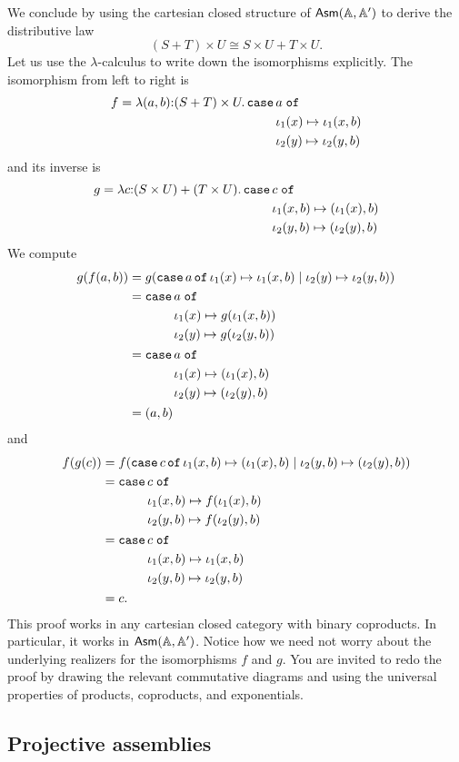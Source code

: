 We conclude by using the cartesian closed structure of $\mathsf{Asm}(\mathbb{A},\mathbb{A}')$ to
derive the distributive law
%
\begin{equation*}
  (S + T) \times U \cong
  S \times U + T \times U.
\end{equation*}
%
Let us use the $\lambda$-calculus to write down the isomorphisms
explicitly. The isomorphism from left to right is
%
\begin{equation*}
  f = \lam{(a,b) \of (S + T) \times U}{
    \xcase{a}
    {\iota_1(x)}{\iota_1(x, b)}
    {\iota_2(y)}{\iota_2(y, b)}
  }
\end{equation*}
%
and its inverse is
%
\begin{equation*}
  g = \lam{c \of (S \times U) + (T \times U)}{
    \xcase{c}
    {\iota_1(x,b)}{(\iota_1(x), b)}
    {\iota_2(y,b)}{(\iota_2(y), b)}
  }
\end{equation*}
%
We compute
%
\begin{align*}
  g(f(a, b)) &=
  g(\mathtt{case}\,a\,\mathtt{of}\,\iota_1(x) \mapsto \iota_1(x, b) \mid \iota_2(y) \mapsto \iota_2(y, b)) \\
  &=
  \begin{aligned}[t]\mathtt{case}\,&a\;\mathtt{of}\\&\iota_1(x) \mapsto g(\iota_1(x, b)) \\&\iota_2(y) \mapsto g(\iota_2(y, b))\end{aligned} \\
  &=
  \begin{aligned}[t]\mathtt{case}\,&a\;\mathtt{of}\\&\iota_1(x) \mapsto (\iota_1(x), b) \\&\iota_2(y) \mapsto (\iota_2(y), b)\end{aligned} \\
  &=
  (a,b)
\end{align*}
%
and
\begin{align*}
  f(g(c)) &=
  f(
    \mathtt{case}\,c\,\mathtt{of}\,\iota_1(x,b) \mapsto (\iota_1(x), b) \mid \iota_2(y,b) \mapsto (\iota_2(y), b)
  )
  \\
  &=
  \begin{aligned}[t]\mathtt{case}\,&c\;\mathtt{of}\\&\iota_1(x,b) \mapsto f(\iota_1(x), b) \\&\iota_2(y,b) \mapsto f(\iota_2(y), b)\end{aligned}
  \\
  &=
  \begin{aligned}[t]\mathtt{case}\,&c\;\mathtt{of}\\&\iota_1(x,b) \mapsto \iota_1(x, b) \\&\iota_2(y,b) \mapsto \iota_2(y, b)\end{aligned} \\
  &=
  c.
\end{align*}
%
This proof works in any cartesian closed category with binary
coproducts. In particular, it works in $\mathsf{Asm}(\mathbb{A},\mathbb{A}')$. Notice how we need not
worry about the underlying realizers for the isomorphisms $f$ and $g$.
You are invited to redo the proof by drawing the relevant commutative
diagrams and using the universal properties of products, coproducts,
and exponentials.

\subsection{Projective assemblies}
\label{sec:projective-assemblies}

